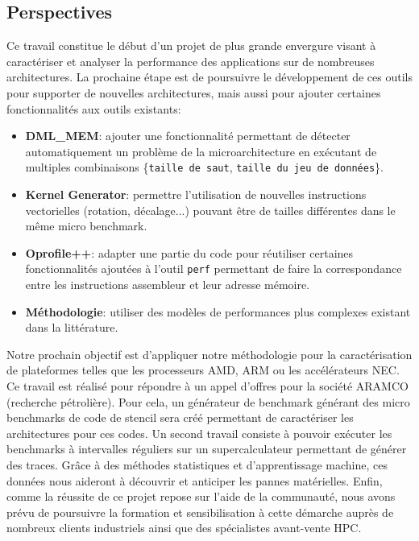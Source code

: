      
\subsection*{Perspectives}
    
    Ce travail constitue le début d'un projet de plus grande envergure visant à caractériser et analyser la performance des applications sur de nombreuses architectures. La prochaine étape est de poursuivre le développement de ces outils pour supporter de nouvelles architectures, mais aussi pour ajouter certaines fonctionnalités aux outils existants:
    \begin{itemize}
        \item \textbf{DML\_MEM}: ajouter une fonctionnalité permettant de détecter automatiquement un problème de la microarchitecture en exécutant de multiples combinaisons \{\verb|taille de saut|, \verb|taille du jeu de données|\}.
        \item \textbf{Kernel Generator}: permettre l'utilisation de nouvelles instructions vectorielles (rotation, décalage...) pouvant être de tailles différentes dans le même micro benchmark.
        \item \textbf{Oprofile++}: adapter une partie du code pour réutiliser certaines fonctionnalités ajoutées à l'outil \verb|perf| permettant de faire la correspondance entre les instructions assembleur et leur adresse mémoire.
        \item \textbf{Méthodologie}: utiliser des modèles de performances plus complexes existant dans la littérature.
    \end{itemize}

    Notre prochain objectif est d’appliquer notre méthodologie pour la caractérisation de plateformes telles que les processeurs AMD, ARM ou les accélérateurs NEC. Ce travail est réalisé pour répondre à un appel d’offres pour la société ARAMCO (recherche pétrolière). Pour cela, un générateur de benchmark générant des micro benchmarks de code de stencil sera créé permettant de caractériser les architectures pour ces codes. Un second travail consiste à pouvoir exécuter les benchmarks à intervalles réguliers sur un supercalculateur permettant de générer des traces. Grâce à des méthodes statistiques et d'apprentissage machine, ces données nous aideront à découvrir et anticiper les pannes matérielles. Enfin, comme la réussite de ce projet repose sur l’aide de la communauté, nous avons prévu de poursuivre la formation et sensibilisation à cette démarche auprès de nombreux clients industriels ainsi que des spécialistes avant-vente HPC.
    

